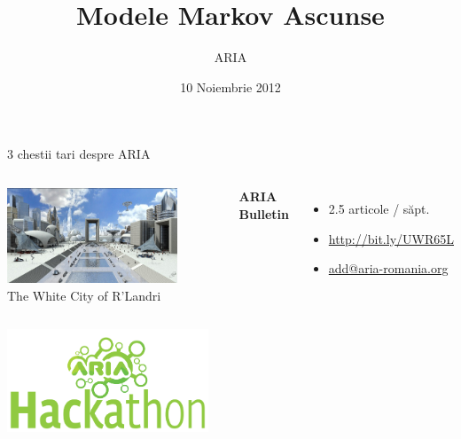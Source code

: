 \documentclass{beamer}
\title[Modele Markov Ascunse]{Modele Markov Ascunse}
\date{10 Noiembrie 2012}
\author[ARIA]{ARIA}
\begin{document}

\begin{frame}[t]
	\begin{center}
		\Large{3 chestii tari despre ARIA}
	\end{center}%
	\pause
	
	\begin{columns}
			\begin{center}
				\includegraphics[width=0.8\textwidth]{graphics/intro/rlandri}\\%
				\small{The White City of R'Landri}
			\end{center}
			\pause
			\textbf{ARIA Bulletin}%
			\vspace*{0.25em}
			\begin{itemize}
				\item 2.5 articole / săpt.
				\item \small{\url{http://bit.ly/UWR65L}}
				\pause
				\item \small{\url{add@aria-romania.org}}
			\end{itemize}
	\end{columns}
	\pause	
	
	\begin{center}
		\includegraphics[width=0.45\textwidth]{graphics/intro/aria-hackathon}%
	\end{center}
\end{frame}
\end{document}

